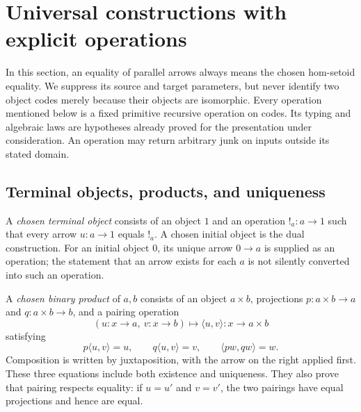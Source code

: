 \section{Universal constructions with explicit operations}\label{sec:limits}

In this section, an equality of parallel arrows always means the chosen
hom-setoid equality.  We suppress its source and target parameters, but never
identify two object codes merely because their objects are isomorphic.  Every
operation mentioned below is a fixed primitive recursive operation on codes.
Its typing and algebraic laws are hypotheses already proved for the
presentation under consideration.  An operation may return arbitrary junk on
inputs outside its stated domain.

\subsection{Terminal objects, products, and uniqueness}

A \emph{chosen terminal object} consists of an object $1$ and an operation
$!_a:a\to1$ such that every arrow $u:a\to1$ equals $!_a$.  A chosen initial
object is the dual construction.  For an initial object $0$, its unique arrow
$0\to a$ is supplied as an operation; the statement that an arrow exists for
each $a$ is not silently converted into such an operation.

A \emph{chosen binary product} of $a,b$ consists of an object $a\times b$,
projections $p:a\times b\to a$ and $q:a\times b\to b$, and a pairing operation
\[
 (u:x\to a,\ v:x\to b)\longmapsto\langle u,v\rangle:x\to a\times b
\]
satisfying
\[
 p\langle u,v\rangle=u,\qquad q\langle u,v\rangle=v,\qquad
 \langle pw,qw\rangle=w.
\]
Composition is written by juxtaposition, with the arrow on the right applied
first.  These three equations include both existence and uniqueness.  They
also prove that pairing respects equality: if $u=u'$ and $v=v'$, the two
pairings have equal projections and hence are equal.

